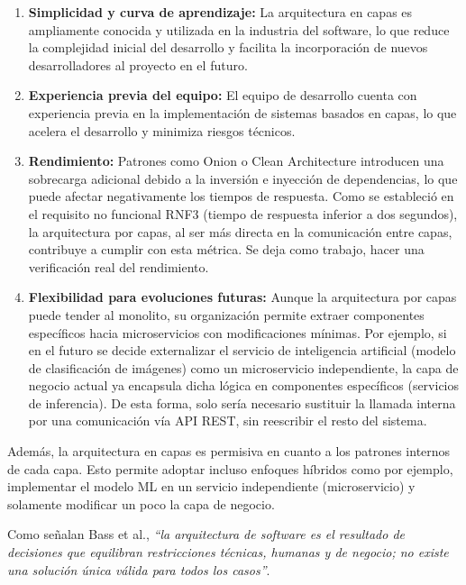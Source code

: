 \begin{enumerate}
    \item \textbf{Simplicidad y curva de aprendizaje:} La arquitectura en capas es ampliamente conocida y utilizada en la industria del software, lo que reduce la complejidad inicial del desarrollo y facilita la incorporación de nuevos desarrolladores al proyecto en el futuro\cite{layeredCommon}.
    \item \textbf{Experiencia previa del equipo:} El equipo de desarrollo cuenta con experiencia previa en la implementación de sistemas basados en capas, lo que acelera el desarrollo y minimiza riesgos técnicos.
    \item \textbf{Rendimiento:} Patrones como Onion o Clean Architecture introducen una sobrecarga adicional debido a la inversión e inyección de dependencias, lo que puede afectar negativamente los tiempos de respuesta. Como se estableció en el requisito no funcional RNF3 (tiempo de respuesta inferior a dos segundos), la arquitectura por capas, al ser más directa en la comunicación entre capas, contribuye a cumplir con esta métrica\cite{layeredPerformance}. Se deja como trabajo, hacer una verificaci\'on real del rendimiento.
    \item \textbf{Flexibilidad para evoluciones futuras:} Aunque la arquitectura por capas puede tender al monolito, su organización permite extraer componentes específicos hacia microservicios con modificaciones mínimas. Por ejemplo, si en el futuro se decide externalizar el servicio de inteligencia artificial (modelo de clasificación de imágenes) como un microservicio independiente, la capa de negocio actual ya encapsula dicha lógica en componentes específicos (servicios de inferencia). De esta forma, solo sería necesario sustituir la llamada interna por una comunicación vía API REST, sin reescribir el resto del sistema\cite{layeredEvolution}.
\end{enumerate}

Además, la arquitectura en capas es permisiva en cuanto a los patrones internos de cada 
capa. Esto permite adoptar incluso enfoques h\'ibridos
como por ejemplo, implementar el modelo ML en un servicio independiente (microservicio)
y solamente modificar un poco la capa de negocio.

Como señalan Bass et al.\cite{bassArchitecture}, 
\emph{``la arquitectura de software es el resultado de decisiones que equilibran restricciones técnicas, humanas y de negocio; no existe una solución única válida para todos los casos''}.

